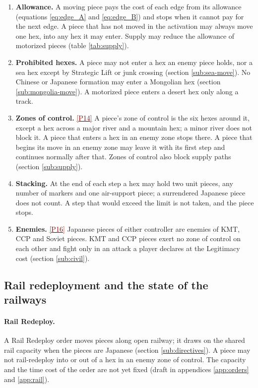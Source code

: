 \documentclass[11pt]{article}
\newcommand{\ptest}[1]{\hyperlink{ptest}{\textcolor{darkred}{[P#1]}}}
\begin{document}
\begin{enumerate}
\item \textbf{Allowance.} A moving piece pays the cost of each edge from its allowance (equations \eqref{eq:edge_A} and \eqref{eq:edge_B}) and stops when it cannot pay for the next edge. A piece that has not moved in the activation may always move one hex, into any hex it may enter. Supply may reduce the allowance of motorized pieces (table \ref{tab:supply}).
\item \textbf{Prohibited hexes.} A piece may not enter a hex an enemy piece holds, nor a sea hex except by Strategic Lift or junk crossing (section \ref{sub:sea-move}). No Chinese or Japanese formation may enter a Mongolian hex (section \ref{sub:mongolia-move}). A motorized piece enters a desert hex only along a track.
\item \textbf{Zones of control.} \ptest{14} A piece's zone of control is the six hexes around it, except a hex across a major river and a mountain hex; a minor river does not block it. A piece that enters a hex in an enemy zone stops there. A piece that begins its move in an enemy zone may leave it with its first step and continues normally after that. Zones of control also block supply paths (section \ref{sub:supply}).
\item \textbf{Stacking.} At the end of each step a hex may hold two unit pieces, any number of markers and one air-support piece; a surrendered Japanese piece does not count. A step that would exceed the limit is not taken, and the piece stops.
\item \textbf{Enemies.} \ptest{16} Japanese pieces of either controller are enemies of KMT, CCP and Soviet pieces. KMT and CCP pieces exert no zone of control on each other and fight only in an attack a player declares at the Legitimacy cost (section \ref{sub:civil}).
\end{enumerate}

\subsection{Rail redeployment and the state of the railways}\label{sub:rail}
\paragraph{Rail Redeploy.} A Rail Redeploy order moves pieces along open railway; it draws on the shared rail capacity when the pieces are Japanese (section \ref{sub:directives}). A piece may not rail-redeploy into or out of a hex in an enemy zone of control. The capacity and the time cost of the order are not yet fixed (draft in appendices \ref{app:orders} and \ref{app:rail}).
\end{document}
